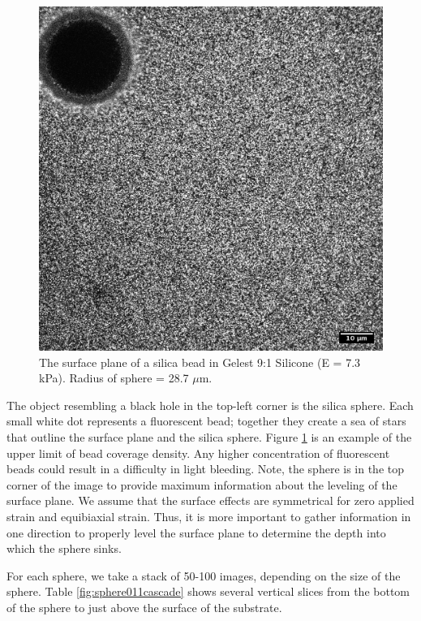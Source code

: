 \begin{figure}[h!]
	\centering
	\includegraphics[width=.75\linewidth]{Chapters/Figures/190215_g91_glass_sphere011_surface.png}
	\caption[The surface plane of a silica bead in silcone]{The surface plane of a silica bead in Gelest 9:1 Silicone (E = 7.3 kPa). Radius of sphere = 28.7 $\mu$m.}
	\label{fig:190215g91glasssphere011surface}
\end{figure}
The object resembling a black hole in the top-left corner is the silica sphere. Each small white dot represents a fluorescent bead; together they create a sea of stars that outline the surface plane and the silica sphere. Figure \ref{fig:190215g91glasssphere011surface} is an example of the upper limit of bead coverage density. Any higher concentration of fluorescent beads could result in a difficulty in light bleeding. Note, the sphere is in the top corner of the image to provide maximum information about the leveling of the surface plane. We assume that the surface effects are symmetrical for zero applied strain and equibiaxial strain. Thus, it is more important to gather information in one direction to properly level the surface plane to determine the depth into which the sphere sinks. 

For each sphere, we take a stack of 50-100 images, depending on the size of the sphere. Table \ref{fig:sphere011cascade} shows several vertical slices from the bottom of the sphere to just above the surface of the substrate.

